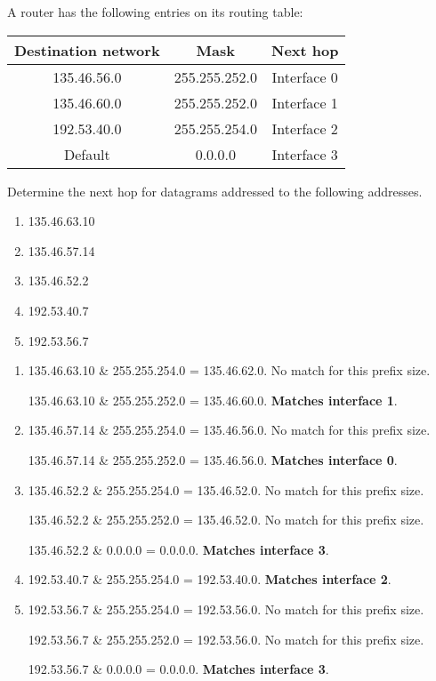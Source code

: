 \documentclass[12pt, oneside]{book}
\begin{document}
\begin{Exercise}
A router has the following entries on its routing table:

\begin{center}
\begin{tabular}{c|c|c}
    Destination network & Mask          & Next hop    \\ \hline
            135.46.56.0 & 255.255.252.0 & Interface 0 \\ \hline
            135.46.60.0 & 255.255.252.0 & Interface 1 \\ \hline
            192.53.40.0 & 255.255.254.0 & Interface 2 \\ \hline
            Default     &       0.0.0.0 & Interface 3
\end{tabular}
\end{center}

Determine the next hop for datagrams addressed to the following addresses.

\begin{enumerate}
    \item 135.46.63.10
    \item 135.46.57.14
    \item 135.46.52.2
    \item 192.53.40.7
    \item 192.53.56.7
\end{enumerate}
\end{Exercise}
\begin{Answer}
\begin{enumerate}
    \item 135.46.63.10 \& 255.255.254.0 = 135.46.62.0. No match for this prefix size.

    135.46.63.10 \& 255.255.252.0 = 135.46.60.0. \textbf{Matches interface 1}.

    \item 135.46.57.14 \& 255.255.254.0 = 135.46.56.0. No match for this prefix size.

    135.46.57.14 \& 255.255.252.0 = 135.46.56.0. \textbf{Matches interface 0}.

    \item 135.46.52.2 \& 255.255.254.0 = 135.46.52.0. No match for this prefix size.

    135.46.52.2 \& 255.255.252.0 = 135.46.52.0. No match for this prefix size.

    135.46.52.2 \& 0.0.0.0 = 0.0.0.0. \textbf{Matches interface 3}.

    \item 192.53.40.7 \& 255.255.254.0 = 192.53.40.0. \textbf{Matches interface 2}.

    \item 192.53.56.7 \& 255.255.254.0 = 192.53.56.0. No match for this prefix size.

    192.53.56.7 \& 255.255.252.0 = 192.53.56.0. No match for this prefix size.

    192.53.56.7 \& 0.0.0.0 = 0.0.0.0. \textbf{Matches interface 3}.
\end{enumerate}
\end{Answer}
\end{document}
